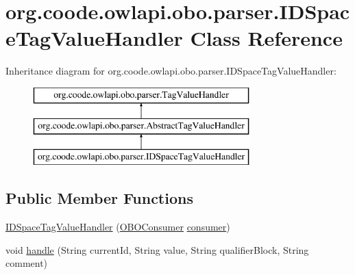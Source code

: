 \hypertarget{classorg_1_1coode_1_1owlapi_1_1obo_1_1parser_1_1_i_d_space_tag_value_handler}{\section{org.\-coode.\-owlapi.\-obo.\-parser.\-I\-D\-Space\-Tag\-Value\-Handler Class Reference}
\label{classorg_1_1coode_1_1owlapi_1_1obo_1_1parser_1_1_i_d_space_tag_value_handler}
}
Inheritance diagram for org.\-coode.\-owlapi.\-obo.\-parser.\-I\-D\-Space\-Tag\-Value\-Handler\-:\begin{figure}[H]
\begin{center}
\leavevmode
\includegraphics[height=3.000000cm]{classorg_1_1coode_1_1owlapi_1_1obo_1_1parser_1_1_i_d_space_tag_value_handler}
\end{center}
\end{figure}
\subsection*{Public Member Functions}
\begin{DoxyCompactItemize}
\item 
\hyperlink{classorg_1_1coode_1_1owlapi_1_1obo_1_1parser_1_1_i_d_space_tag_value_handler_a1ca94ad766bc29cd28e197593419c9b1}{I\-D\-Space\-Tag\-Value\-Handler} (\hyperlink{classorg_1_1coode_1_1owlapi_1_1obo_1_1parser_1_1_o_b_o_consumer}{O\-B\-O\-Consumer} \hyperlink{classorg_1_1coode_1_1owlapi_1_1obo_1_1parser_1_1_abstract_tag_value_handler_ab27f1ff22d15640c5f81585f18265137}{consumer})
\item 
void \hyperlink{classorg_1_1coode_1_1owlapi_1_1obo_1_1parser_1_1_i_d_space_tag_value_handler_abc0887be1addaf88d917ee910ce44d68}{handle} (String current\-Id, String value, String qualifier\-Block, String comment)
\end{DoxyCompactItemize}
